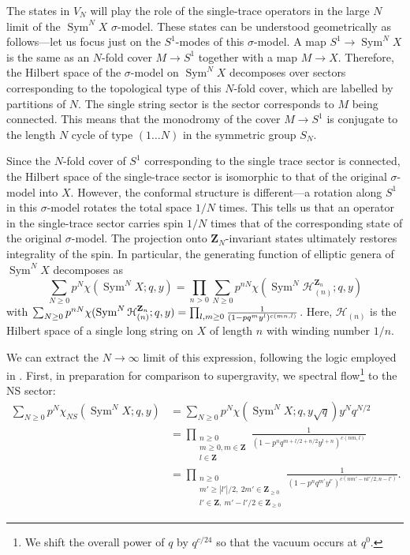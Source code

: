 \documentclass[11pt]{amsart}
\newcommand{\Z}{\mathbf Z}
\DeclareMathOperator{\Sym}{Sym} \DeclareMathOperator{\Hom}{Hom}
\theoremstyle{thm}
\numberwithin{equation}{subsection}
\theoremstyle{def}
\theoremstyle{rem}
\begin{document}
The states in $V_N$ will play the role of the single-trace operators in the large $N$ limit of the $\Sym^N X$ $\sigma$-model.   
These states can be understood geometrically as follows---let us focus just on the $S^1$-modes of this $\sigma$-model.
A map $S^1 \to \Sym^N X$ is the same as an $N$-fold cover $M \to S^1$ together with a map $M \to X$.  
Therefore, the Hilbert space of the $\sigma$-model on $\Sym^N X$ decomposes over sectors corresponding to the topological type of this $N$-fold cover, which are labelled by partitions of $N$. 
The single string sector is the sector corresponds to $M$ being connected. 
This means that the monodromy of the cover $M \to  S^1$ is conjugate to the length $N$ cycle of type $(1 \dots N)$ in the symmetric group $S_N$.  

Since the $N$-fold cover of $S^1$ corresponding to the single trace sector is connected, the Hilbert space of the single-trace sector is isomorphic to that of the original $\sigma$-model into $X$.  
However, the conformal structure is different---a rotation along $S^1$ in this $\sigma$-model rotates the total space $1/N$ times.
This tells us that an operator in the single-trace sector carries spin $1/N$ times that of the corresponding state of the original $\sigma$-model. 
The projection onto $\Z_N$-invariant states ultimately restores integrality of the spin. 
In particular, the generating function of elliptic genera of $\Sym^N X$ decomposes as
\begin{equation}
\sum_{N\geq 0}p^N \chi(\Sym^N X; q, y) = \prod_{n>0}\sum_{N \geq 0}p^{n N}\chi(\Sym^{N}\mathcal{H}^{\Z_n}_{(n)}; q, y)
\end{equation}
with $\sum_{N \geq 0}p^{n N}\chi(\Sym^{N}\mathcal{H}^{\Z_n}_{(n)}; q, y) = \prod_{l, m\geq0}{1 \over (1 - p q^m y^l)^{c(mn, l)}}$. Here, $\mathcal{H}_{(n)}$ is the Hilbert space of a single long string on $X$ of length $n$ with winding number $1/n$. 

We can extract the $N \rightarrow \infty$ limit of this expression, following the logic employed in \cite{de Boer, MAGOO, BKKP}. First, in preparation for comparison to supergravity, we spectral flow\footnote{We shift the overall power of $q$ by $q^{c/24}$ so that the vacuum occurs at $q^0$.} to the NS sector:
\begin{align*}
\sum_{N \geq 0}p^N \chi_{NS}(\Sym^N X; q, y) & = \sum_{N\geq 0}p^N \chi(\Sym^N X; q, y \sqrt{q}) y^N q^{N/2} \\
&= \prod_{\substack{n \geq 0 \\ m \geq 0, m \in \Z \\ l \in \Z}} \frac{1}{(1 - p^n q^{m + l/2 + n/2} y^{l + n})^{c(nm,l)}} \\
&= \prod_{\substack{n \geq0 \\ m' \geq |l'|/2, \ 2 m' \in \Z_{\geq 0} \\ l' \in \Z, \ m' - l'/2 \in \Z_{\geq 0}}} \frac{1}{(1 - p^n q^{m'} y^{l'})^{c(nm' - nl'/2,n-l')}}.
\end{align*}
\end{document}
